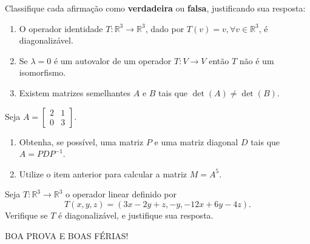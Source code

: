 \documentclass[12pt,a4paper]{article}
\newcommand{\fixme}{{\color{red}(...)}}
\newcommand*\R{\mathbb{R}}
\begin{document}
\begin{ExerciseList}
\Exercise[title={3,0}] Classifique cada afirmação como \textbf{verdadeira} ou \textbf{falsa}, justificando sua resposta:
\begin{enumerate}
\item O operador identidade $T: \R^3 \to \R^3$, dado por $T(v) = v, \forall v \in \R^3$, é diagonalizável.
\item Se $\lambda = 0$ é um autovalor de um operador $T : V \to V$ então $T$ não é um isomorfismo.
\item Existem matrizes semelhantes $A$ e $B$ tais que $\det(A) \neq \det(B)$.
\end{enumerate}
\Answer \fixme

\Exercise[title={3,0}] Seja $A =
\begin{bmatrix}
2 & 1 \\ 0 & 3
\end{bmatrix}$.
\begin{enumerate}
\item Obtenha, se possível, uma matriz $P$ e uma matriz diagonal $D$ tais que $A = P D P^{-1}$.
\item Utilize o item anterior para calcular a matriz $M = A^5$.
\end{enumerate}
\Answer \fixme

\Exercise[title={3,0}] Seja $T : \R^3 \to \R^3$ o operador linear definido por
\[
T(x,y,z) = (3x-2y+z, -y, -12x+6y-4z).
\]
Verifique se $T$ é diagonalizável, e justifique sua resposta.
\Answer \fixme
\end{ExerciseList}

\begin{center}
BOA PROVA E BOAS FÉRIAS!
\end{center}

\end{document}
